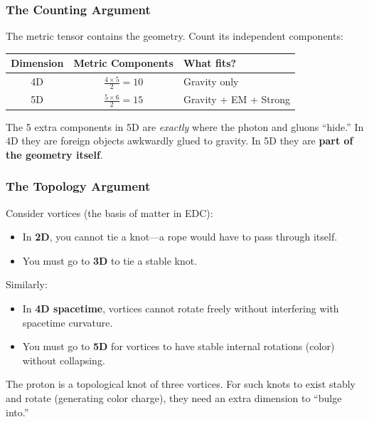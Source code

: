 \subsubsection{The Counting Argument}

The metric tensor contains the geometry. Count its independent components:

\begin{center}
\begin{tabular}{|c|c|l|}
\hline
\textbf{Dimension} & \textbf{Metric Components} & \textbf{What fits?} \\
\hline
4D & $\frac{4 \times 5}{2} = 10$ & Gravity only \\
\hline
5D & $\frac{5 \times 6}{2} = 15$ & Gravity + EM + Strong \\
\hline
\end{tabular}
\end{center}

The 5 extra components in 5D are \textit{exactly} where the photon and gluons ``hide.'' In 4D they are foreign objects awkwardly glued to gravity. In 5D they are \textbf{part of the geometry itself}.

\subsubsection{The Topology Argument}

Consider vortices (the basis of matter in EDC):

\begin{itemize}
    \item In \textbf{2D}, you cannot tie a knot---a rope would have to pass through itself.
    \item You must go to \textbf{3D} to tie a stable knot.
\end{itemize}

Similarly:

\begin{itemize}
    \item In \textbf{4D spacetime}, vortices cannot rotate freely without interfering with spacetime curvature.
    \item You must go to \textbf{5D} for vortices to have stable internal rotations (color) without collapsing.
\end{itemize}

The proton is a topological knot of three vortices. For such knots to exist stably and rotate (generating color charge), they need an extra dimension to ``bulge into.''

